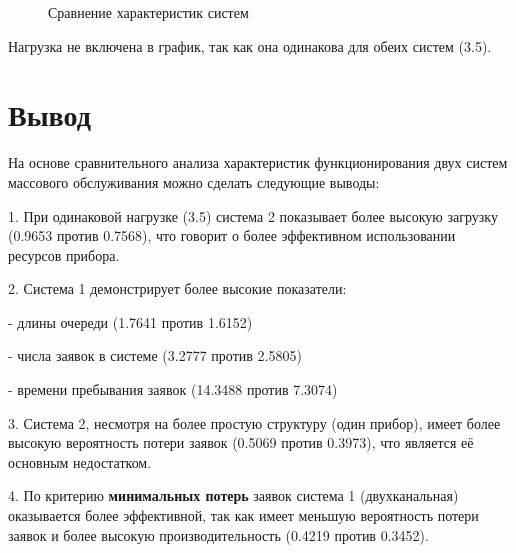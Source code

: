 \documentclass{article}
\begin{document}
\begin{figure}[H]
    \centering
    \caption{Сравнение характеристик систем}
    \label{fig:system_comparison}
\end{figure}
Нагрузка не включена в график, так как она одинакова для обеих систем (3.5).
\section*{Вывод }
На основе сравнительного анализа характеристик функционирования двух систем массового обслуживания можно сделать следующие выводы:

1. При одинаковой нагрузке (3.5) система 2 показывает более высокую загрузку (0.9653 против 0.7568), что говорит о более эффективном использовании ресурсов прибора.

2. Система 1 демонстрирует более высокие показатели:

   - длины очереди (1.7641 против 1.6152)

   - числа заявок в системе (3.2777 против 2.5805)
   
   - времени пребывания заявок (14.3488 против 7.3074)
   
3. Система 2, несмотря на более простую структуру (один прибор), имеет более высокую вероятность потери заявок (0.5069 против 0.3973), что является её основным недостатком.

4. По критерию \textbf{минимальных потерь} заявок система 1 (двухканальная) оказывается более эффективной, так как имеет меньшую вероятность потери заявок и более высокую производительность (0.4219 против 0.3452).
\end{document}
